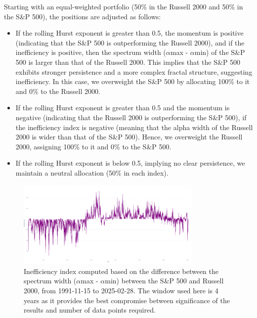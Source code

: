 \documentclass[11pt]{extarticle}
\begin{document}
Starting with an equal-weighted portfolio (50\% in the Russell 2000 and 50\% in the S\&P 500), the positions are adjusted as follows:

\begin{itemize}
    \item If the rolling Hurst exponent is greater than 0.5, the momentum is positive (indicating that the S\&P 500 is
    outperforming the Russell 2000), and if the inefficiency is positive,
    then the spectrum width ($\alpha$max - $\alpha$min) of the S\&P 500 is larger than that of the Russell 2000. This implies that the S\&P 500 exhibits stronger
    persistence and a more complex fractal structure, suggesting inefficiency. In this case, we overweight the S\&P 500 by allocating
    100\% to it and 0\% to the Russell 2000.

    \item If the rolling Hurst exponent is greater than 0.5 and the momentum is negative (indicating that the Russell 2000 is
    outperforming the S\&P 500), if the inefficiency index is negative (meaning that the alpha width of the
    Russell 2000 is wider than that of the S\&P 500). Hence, we overweight the Russell 2000, assigning 100\% to it and 0\% to the S\&P 500.

    \item If the rolling Hurst exponent is below 0.5, implying no clear persistence, we maintain a neutral allocation (50\% in each index).
\end{itemize}


\begin{figure}[ht]
    \centering
    \includegraphics[width=0.8\textwidth]{img/inefficiency_index.png}
    \caption{Inefficiency index computed based on the difference between the spectrum width ($\alpha$max - $\alpha$min) between the
    S\&P 500 and Russell 2000, from 1991-11-15 to 2025-02-28. The window used here is 4 years as it provides the best compromise between significance of the results
    and number of data points required.}
    \label{fig:inefficiency_index}
\end{figure}
\FloatBarrier
\end{document}
